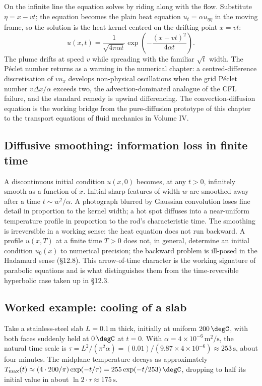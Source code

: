 On the infinite line the equation solves by riding along with the
flow. Substitute $\eta = x - v t$; the equation becomes the plain
heat equation $u_{t} = \alpha u_{\eta\eta}$ in the moving frame, so
the solution is the heat kernel centred on the drifting point $x =
v t$:
\[
u(x, t) = \frac{1}{\sqrt{4\pi\alpha t}}\exp\!\left(-\frac{(x - v t)^{2}}{4\alpha t}\right).
\]
The plume drifts at speed $v$ while spreading with the familiar
$\sqrt{t}$ width. The P\'eclet number returns as a warning in the
numerical chapter: a centred-difference discretisation of $v u_{x}$
develops non-physical oscillations when the grid P\'eclet number
$v\Delta x/\alpha$ exceeds two, the advection-dominated analogue of
the CFL failure, and the standard remedy is upwind differencing.
The convection-diffusion equation is the working bridge from the
pure-diffusion prototype of this chapter to the transport equations
of fluid mechanics in Volume IV.

\subsection{Diffusive smoothing: information loss in finite time}

A discontinuous initial condition $u(x, 0)$ becomes, at any $t >
0$, infinitely smooth as a function of $x$. Initial sharp features
of width $w$ are smoothed away after a time $t \sim w^{2}/\alpha$.
A photograph blurred by Gaussian convolution loses fine detail in
proportion to the kernel width; a hot spot diffuses into a
near-uniform temperature profile in proportion to the rod's
characteristic time. The smoothing is irreversible in a working
sense: the heat equation does not run backward. A profile $u(x,
T)$ at a finite time $T > 0$ does not, in general, determine an
initial condition $u_{0}(x)$ to numerical precision; the
backward problem is ill-posed in the Hadamard sense (§12.8). This
arrow-of-time character is the working signature of parabolic
equations and is what distinguishes them from the time-reversible
hyperbolic case taken up in §12.3.

\subsection{Worked example: cooling of a slab}

Take a stainless-steel slab $L = 0.1\,\si{\meter}$ thick,
initially at uniform $200\,\degC$, with both faces suddenly held
at $0\,\degC$ at $t = 0$. With $\alpha = 4 \times 10^{-6}\,\si
{\meter\squared\per\second}$, the natural time scale is $\tau =
L^{2}/(\pi^{2}\alpha) = (0.01)/(9.87 \times 4 \times 10^{-6})
\approx 253\,\si{\second}$, about four minutes. The midplane
temperature decays as approximately $T_{\max}(t) \approx (4 \cdot
200/\pi) \exp(-t/\tau) = 255 \exp(-t/253)\,\degC$, dropping to
half its initial value in about $\ln 2 \cdot \tau \approx
175\,\si{\second}$.


